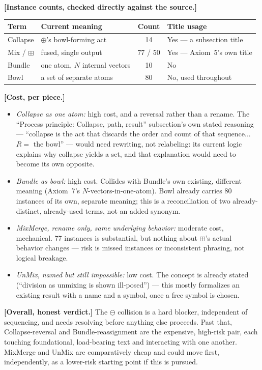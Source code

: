 \documentclass[11pt]{article}
\begin{document}
\textbf{[Instance counts, checked directly against the source.]}
\begin{center}
\begin{tabular}{llcl}
Term & Current meaning & Count & Title usage \\
\hline
Collapse & $\oplus$'s bowl-forming act & 14 & Yes --- a subsection
title \\
Mix / $\boxplus$ & fused, single output & 77 / 50 & Yes --- Axiom~5's
own title \\
Bundle & one atom, $N$ internal vectors & 10 & No \\
Bowl & a set of separate atoms & 80 & No, used throughout \\
\end{tabular}
\end{center}

\textbf{[Cost, per piece.]}
\begin{itemize}
\item \emph{Collapse as one atom:} high cost, and a reversal rather
      than a rename. The ``Process principle: Collapse, path,
      result'' subsection's own stated reasoning --- ``collapse is
      the act that discards the order and count of that sequence...
      $R=$ the bowl'' --- would need rewriting, not relabeling: its
      current logic explains why collapse yields a set, and that
      explanation would need to become its own opposite.
\item \emph{Bundle as bowl:} high cost. Collides with Bundle's own
      existing, different meaning (Axiom~7's $N$-vectors-in-one-atom).
      Bowl already carries 80 instances of its own, separate meaning;
      this is a reconciliation of two already-distinct, already-used
      terms, not an added synonym.
\item \emph{MixMerge, rename only, same underlying behavior:}
      moderate cost, mechanical. 77 instances is substantial, but
      nothing about $\boxplus$'s actual behavior changes --- risk is
      missed instances or inconsistent phrasing, not logical
      breakage.
\item \emph{UnMix, named but still impossible:} low cost. The concept
      is already stated (``division as unmixing is shown ill-posed'')
      --- this mostly formalizes an existing result with a name and a
      symbol, once a free symbol is chosen.
\end{itemize}

\textbf{[Overall, honest verdict.]} The $\ominus$ collision is a hard
blocker, independent of sequencing, and needs resolving before
anything else proceeds. Past that, Collapse-reversal and
Bundle-reassignment are the expensive, high-risk pair, each touching
foundational, load-bearing text and interacting with one another.
MixMerge and UnMix are comparatively cheap and could move first,
independently, as a lower-risk starting point if this is pursued.
\end{document}

